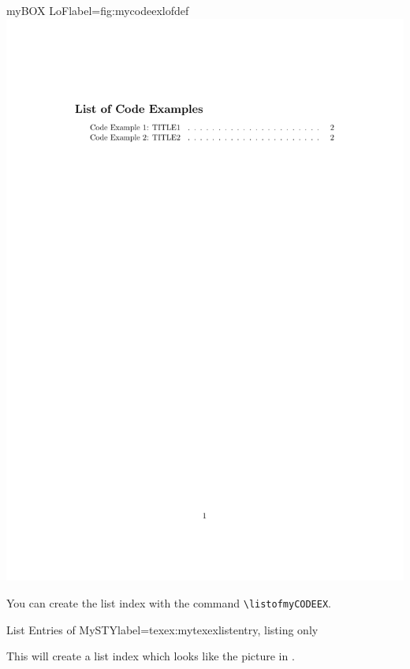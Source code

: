 \documentclass[]{myHOWTO-V001}
\begin{document}
\begin{minipage}{0.46\linewidth}
\centering
\begin{myFIGlst}{myBOX LoF}{label={fig:mycodeexlofdef}}
	\includegraphics[page=1,scale=0.18]{examples/myCODEEXV000.pdf}
\end{myFIGlst}
\end{minipage}
\begin{minipage}{0.46\linewidth}
You can create the list index with the command \Verb|\listofmyCODEEX|.

\begin{myTEXEXdoclst}{List Entries of MySTY}{label={texex:mytexexlistentry}, listing only}
\listofmyCODEEX
\end{myTEXEXdoclst}

This will create a list index which looks like the picture in . 
\end{minipage}
\end{document}
